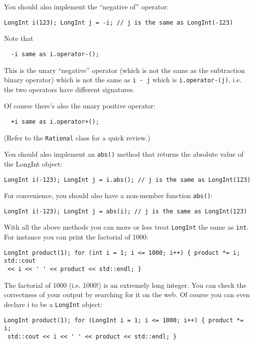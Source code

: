 You should also implement the “negative of” operator:

\begin{Verbatim}[fontsize=\footnotesize,frame=single]
LongInt i(123); LongInt j = -i; // j is the same as LongInt(-123)
\end{Verbatim}

Note that

\verb!  -i same as i.operator-();!

This is the unary “negative” operator (which is not the same as the subtraction
binary operator) which is not the same as \verb!i - j!  which is
\verb!i.operator-(j)!, i.e. the two operators have different signatures.

Of course there's also the unary positive operator:

\verb!  +i same as i.operator+();!

(Refer to the \verb!Rational! class for a quick review.)

You should also implement an \verb!abs()! method that returns the absolute
value of the LongInt object:

\begin{Verbatim}[fontsize=\footnotesize,frame=single]
LongInt i(-123); LongInt j = i.abs(); // j is the same as LongInt(123)
\end{Verbatim}

For convenience, you should also have a non-member function \verb!abs()!:

\begin{Verbatim}[fontsize=\footnotesize,frame=single]
LongInt i(-123); LongInt j = abs(i); // j is the same as LongInt(123)
\end{Verbatim}

With all the above methods you can more or less treat \verb!LongInt! the same
as \verb!int!. For instance you can print the factorial of 1000:

\begin{Verbatim}[fontsize=\footnotesize,frame=single]
LongInt product(1); for (int i = 1; i <= 1000; i++) { product *= i; std::cout
 << i << ' ' << product << std::endl; }
\end{Verbatim}

The factorial of 1000 (i.e. 1000!) is an extremely long integer. You can check
the correctness of your output by searching for it on the web.  Of course you
can even declare i to be a \verb!LongInt! object:

\begin{Verbatim}[fontsize=\footnotesize,frame=single]
LongInt product(1); for (LongInt i = 1; i <= 1000; i++) { product *= i;
 std::cout << i << ' ' << product << std::endl; }
\end{Verbatim}


